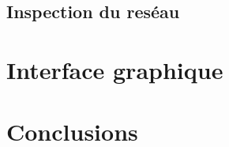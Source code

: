 \documentclass[11pt]{article}
\begin{document}
\subsection{Inspection du res\'eau}

\section{Interface graphique}



\section{Conclusions}
\end{document}
